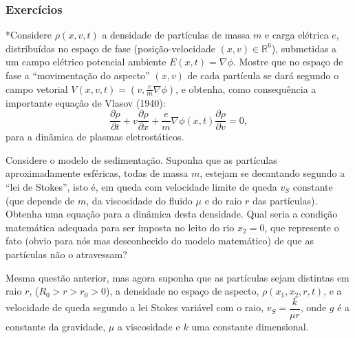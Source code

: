 {\small\color{blue}
\subsubsection*{Exercícios}

\begin{exercise}
*Considere \(\rho(x, v, t)\) a densidade de partículas de massa \(m\) e carga elétrica \(e\), distribuídas no espaço de fase (posição-velocidade \((x, v) \in \mathbb{R}^6\)), submetidas a um campo elétrico potencial ambiente \(E(x,t) = \nabla\phi\). Mostre que no espaço de fase a ``movimentação do aspecto'' \((x, v)\) de cada partícula se dará segundo o campo vetorial \(V(x, v, t) = (v, \frac{e}{m} \nabla\phi)\), e obtenha, como consequência a importante equação de Vlasov (1940):
\[\dfrac{\partial \rho}{\partial t} + v \dfrac{\partial \rho}{\partial x} + \dfrac{e}{m} \nabla\phi(x,t)\dfrac{\partial \rho}{\partial v} = 0,\]
para a dinâmica de plasmas eletrostáticos.

\end{exercise}


\begin{exercise}
Considere o modelo de sedimentação. Suponha que as partículas aproximadamente esféricas, todas de massa \(m\), estejam se decantando segundo a ``lei de Stokes'', isto é, em queda com velocidade limite de queda \(v_S\) constante (que depende de \(m\), da viscosidade do fluido \(\mu\) e do raio \(r\) das partículas). Obtenha uma equação para a dinâmica desta densidade. Qual seria a condição matemática adequada para ser imposta no leito do rio \(x_2 = 0\), que represente o fato (obvio para nós mas desconhecido do modelo matemático) de que as partículas não o atravessam?
\end{exercise}


\begin{exercise}
Mesma questão anterior, mas agora suponha que as partículas sejam distintas em raio \(r\), (\(R_0 > r > r_0 > 0\)), a densidade no espaço de aspecto, \(\rho(x_1, x_2, r, t)\), e a velocidade de queda segundo a lei Stokes variável com o raio, \(v_S = \dfrac{k}{\mu r}\), onde \(g\) é  a constante da gravidade, \(\mu\) a viscosidade e \(k\) uma constante dimensional.
\end{exercise}


}
